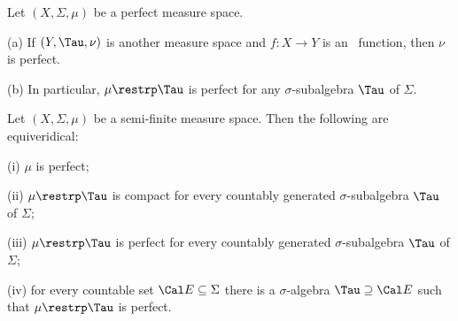  Let $(X,\Sigma,\mu)$ be a perfect measure
space.

(a) If $(Y,\Tau,\nu)$ is another measure space and $f:X\to Y$ is an
\imp\ function, then $\nu$ is perfect.

(b) In particular, $\mu\restrp\Tau$ is perfect for any
$\sigma$-subalgebra $\Tau$ of $\Sigma$.



 Let $(X,\Sigma,\mu)$
be a semi-finite measure
space.   Then the following are equiveridical:

(i) $\mu$ is perfect;

(ii) $\mu\restrp\Tau$ is compact for every
countably generated $\sigma$-subalgebra $\Tau$ of $\Sigma$;

(iii) $\mu\restrp\Tau$ is perfect for every countably generated
$\sigma$-subalgebra $\Tau$ of $\Sigma$;

(iv) for every countable set $\Cal E\subseteq\Sigma$ there is a
$\sigma$-algebra $\Tau\supseteq\Cal E$ such that $\mu\restrp\Tau$ is
perfect.

